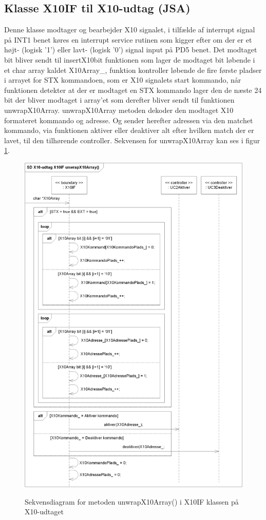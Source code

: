 \subsection{Klasse X10IF til X10-udtag (JSA)}
Denne klasse modtager og bearbejder X10 signalet, i tilfælde af interrupt signal på INT1 benet køres en interrupt service rutinen som kigger efter om der er et højt- (logisk '1') eller lavt- (logisk '0') signal input på PD5 benet. Det modtaget bit bliver sendt til insertX10bit funktionen som lager de modtaget bit løbende i et char array kaldet X10Array\_, funktion kontroller løbende de fire første pladser i arrayet for STX kommandoen, som er X10 signalets start kommando, når funktionen detekter at der er modtaget en STX kommando lager den de næste 24 bit der bliver modtaget i array'et som derefter bliver sendt til funktionen unwrapX10Array. unwrapX10Array metoden dekoder den modtaget X10 formateret kommando og adresse. Og sender herefter adressen via den matchet kommando, via funktionen aktiver eller deaktiver alt efter hvilken match der er lavet, til den tilhørende controller.
Sekvensen for unwrapX10Array kan ses i figur \ref{fig:X10-Udtag_unwrapX10Array_SD}.

\begin{figure}[!htb]
     {\includegraphics[width=\textwidth]{billeder/uml/X10-Udtag_unwrapX10Array_SD}}
     \caption{Sekvensdiagram for metoden unwrapX10Array() i X10IF klassen på X10-udtaget}
     \label{fig:X10-Udtag_unwrapX10Array_SD}
\end{figure}
